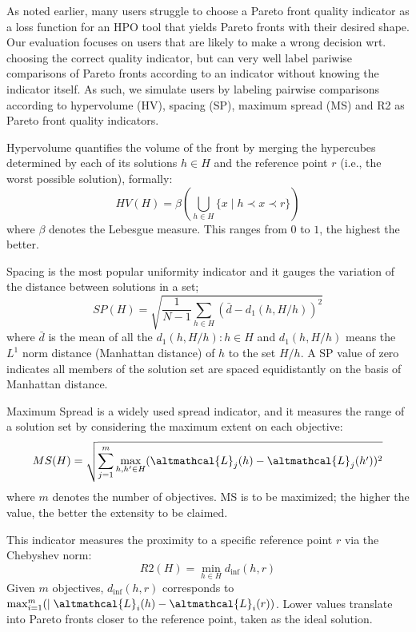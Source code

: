 As noted earlier, many users struggle to choose a Pareto front quality indicator as a loss function for an HPO tool that yields Pareto fronts with their desired shape. Our evaluation focuses on users that are likely to make a wrong decision wrt. choosing the correct quality indicator, but can very well label pariwise comparisons of Pareto fronts according to an indicator without knowing the indicator itself.
As such, we simulate users by labeling pairwise comparisons according to hypervolume (HV), spacing (SP), maximum spread (MS) and R2 as Pareto front quality indicators.

\begin{definition}[Hypervolume (HV)]
    Hypervolume quantifies the volume of the front by merging the hypercubes determined by each of its solutions $h \in H$ and the reference point $r$ (i.e., the worst possible solution), formally:
     $$HV(H) = \beta \left(\bigcup_{h \in H} \{ x \mid h \prec x \prec r \} \right)$$
     where $\beta$ denotes the Lebesgue measure. This ranges from $0$ to $1$, the highest the better.
\end{definition}

\begin{definition}[Spacing (SP)]
    Spacing is the most popular uniformity indicator and it gauges the variation of the distance between solutions in a set;
    $$SP(H) = \sqrt{\frac{1}{N-1} \sum_{h \in H} ( \bar{d} - d_1 ( h, H/h ) )^2}$$
    where $\bar{d}$ is the mean of all the $d_1 ( h, H/h ) : h \in H$ and $d_1 ( h, H/h )$ means the $L^1$ norm distance (Manhattan distance) of $h$ to the set $H/h$. A SP value of zero indicates all members of the solution set are spaced equidistantly on the basis of Manhattan distance.
\end{definition}

\begin{definition}
    Maximum Spread is a widely used spread indicator, and it measures the range of a solution set by considering the maximum extent on each objective:
    $$MS(H) = \sqrt{ \sum_{j = 1}^{m} \max_{h, h' \in H} (\altmathcal{L}_{j}(h) - \altmathcal{L}_{j}(h'))^2}$$
    where $m$ denotes the number of objectives. MS is to be maximized; the higher the value, the better the extensity to be claimed.
\end{definition}

\begin{definition}[R2]
    This indicator measures the proximity to a specific reference point $r$ via the Chebyshev norm:
     $$R2(H) = \min_{h \in H} d_{\inf}(h, r)$$
     Given $m$ objectives, $d_{\inf}(h, r)$ corresponds to $\max_{i=1}^{m}(\mid \altmathcal{L}_i(h) - \altmathcal{L}_i(r))$. Lower values translate into Pareto fronts closer to the reference point, taken as the ideal solution.
\end{definition}

